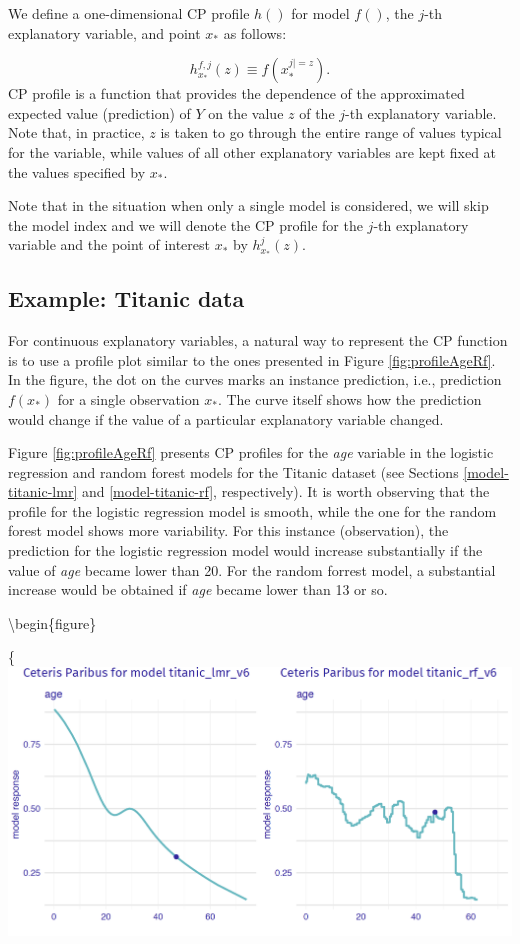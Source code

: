 \documentclass[12pt,]{krantz}
\theoremstyle{definition}
\theoremstyle{definition}
\theoremstyle{definition}
\theoremstyle{remark}
\begin{document}
We define a one-dimensional CP profile \(h()\) for model \(f()\), the
\(j\)-th explanatory variable, and point \(x_*\) as follows:

\[
h^{f,j}_{x_*}(z) \equiv f(x_*^{j|=z}).
\] CP profile is a function that provides the dependence of the
approximated expected value (prediction) of \(Y\) on the value \(z\) of
the \(j\)-th explanatory variable. Note that, in practice, \(z\) is
taken to go through the entire range of values typical for the variable,
while values of all other explanatory variables are kept fixed at the
values specified by \(x_*\).

Note that in the situation when only a single model is considered, we
will skip the model index and we will denote the CP profile for the
\(j\)-th explanatory variable and the point of interest \(x_*\) by
\(h^{j}_{x_*}(z)\).

\hypertarget{CPExample}{%
\subsection{Example: Titanic data}\label{CPExample}}

For continuous explanatory variables, a natural way to represent the CP
function is to use a profile plot similar to the ones presented in
Figure \ref{fig:profileAgeRf}. In the figure, the dot on the curves
marks an instance prediction, i.e., prediction \(f(x_*)\) for a single
observation \(x_*\). The curve itself shows how the prediction would
change if the value of a particular explanatory variable changed.

Figure \ref{fig:profileAgeRf} presents CP profiles for the \emph{age}
variable in the logistic regression and random forest models for the
Titanic dataset (see Sections \ref{model-titanic-lmr} and
\ref{model-titanic-rf}, respectively). It is worth observing that the
profile for the logistic regression model is smooth, while the one for
the random forest model shows more variability. For this instance
(observation), the prediction for the logistic regression model would
increase substantially if the value of \emph{age} became lower than 20.
For the random forrest model, a substantial increase would be obtained
if \emph{age} became lower than 13 or so.

\textbackslash{}begin\{figure\}

\{\centering \includegraphics[width=0.7\linewidth]{figure/profile_age_rf}
\end{document}
